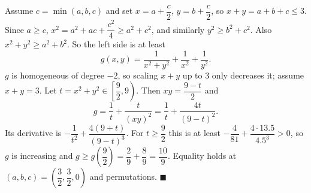 Assume $c=\min(a,b,c)$ and set $x=a+\dfrac c2$, $y=b+\dfrac c2$, so $x+y=a+b+c\le3$. Since $a\ge c$, $x^2=a^2+ac+\dfrac{c^2}4\ge a^2+c^2$, and similarly $y^2\ge b^2+c^2$. Also $x^2+y^2\ge a^2+b^2$. So the left side is at least
\[g(x,y)=\dfrac1{x^2+y^2}+\dfrac1{x^2}+\dfrac1{y^2}.\]
$g$ is homogeneous of degree $-2$, so scaling $x+y$ up to $3$ only decreases it; assume $x+y=3$. Let $t=x^2+y^2\in\left[\dfrac92,9\right)$. Then $xy=\dfrac{9-t}2$ and
\[g=\dfrac1t+\dfrac{t}{(xy)^2}=\dfrac1t+\dfrac{4t}{(9-t)^2}.\]
Its derivative is $-\dfrac1{t^2}+\dfrac{4(9+t)}{(9-t)^3}$. For $t\ge\dfrac92$ this is at least $-\dfrac4{81}+\dfrac{4\cdot13.5}{4.5^3}>0$, so $g$ is increasing and $g\ge g\left(\dfrac92\right)=\dfrac29+\dfrac89=\dfrac{10}9$. Equality holds at $(a,b,c)=\left(\dfrac32,\dfrac32,0\right)$ and permutations. $\blacksquare$
